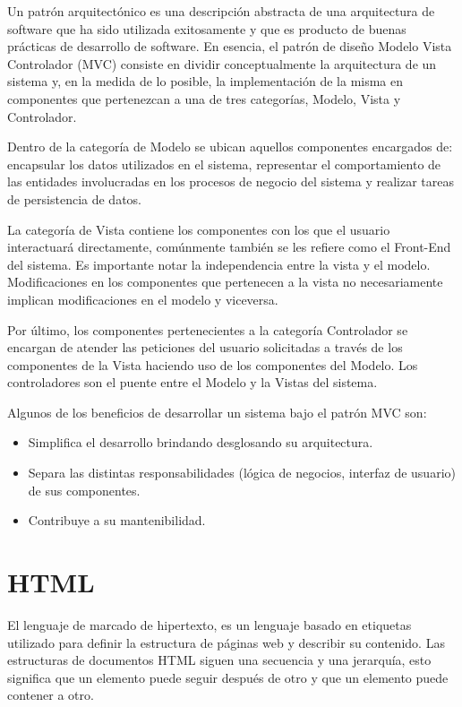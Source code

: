 \documentclass[10pt,a4paper]{report}
\begin{document}
Un patrón arquitectónico es una descripción abstracta de una arquitectura de software que ha sido utilizada exitosamente y que es producto de buenas prácticas de desarrollo de software.  En esencia, el patrón de diseño Modelo Vista Controlador (MVC) consiste en dividir conceptualmente la arquitectura de un sistema y, en la medida de lo posible, la implementación de la misma en componentes que pertenezcan a una de tres categorías, Modelo, Vista y Controlador.

Dentro de la categoría de Modelo se ubican aquellos componentes encargados de: encapsular los datos utilizados en el sistema, representar el comportamiento de las entidades involucradas en los procesos de negocio del sistema y realizar tareas de persistencia de datos.

La categoría de Vista contiene los componentes con los que el usuario interactuará directamente, comúnmente también se les refiere como el Front-End del sistema. Es importante notar la independencia entre la vista y el modelo. Modificaciones en los componentes que pertenecen a la vista no necesariamente implican modificaciones en el modelo y viceversa.

Por último, los componentes pertenecientes a la categoría Controlador se encargan de atender las peticiones del usuario solicitadas a través de los componentes de la Vista haciendo uso de los componentes del Modelo. Los controladores son el puente entre el Modelo y la Vistas del sistema. 

Algunos de los beneficios de desarrollar un sistema bajo el patrón MVC son:

\begin{itemize}
\item Simplifica el desarrollo brindando desglosando su arquitectura.
\item Separa las distintas responsabilidades (lógica de negocios, interfaz de usuario) de sus componentes.
\item Contribuye a su mantenibilidad.
\end{itemize}

\section{HTML}
El lenguaje de marcado de hipertexto, es un lenguaje basado en etiquetas utilizado para definir la estructura de páginas web y describir su contenido. Las estructuras de documentos HTML siguen una secuencia y una jerarquía, esto significa que un elemento puede seguir después de otro y que un elemento puede contener a otro.
\end{document}
